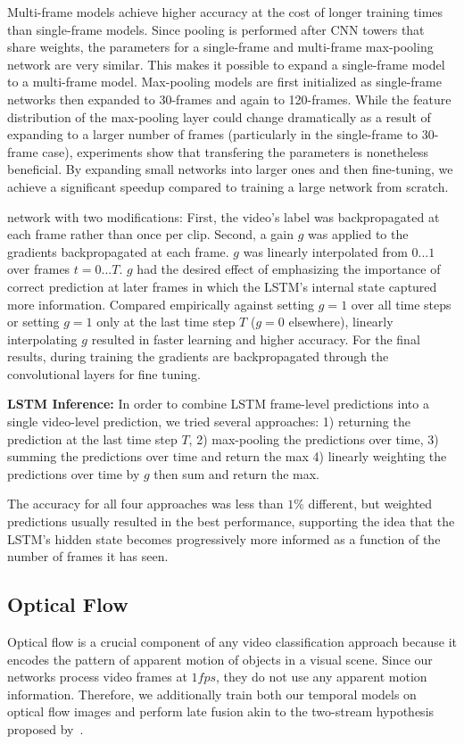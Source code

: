 \documentclass[10pt,twocolumn,letterpaper]{article}
\begin{document}
Multi-frame models achieve higher accuracy at the cost of longer
training times than single-frame models.
Since pooling is performed after CNN towers that
share weights, the parameters for a single-frame and multi-frame
max-pooling network are very similar.
This makes it possible to expand a single-frame model to a
multi-frame model. Max-pooling models are first
initialized as single-frame networks then expanded to 30-frames and
again to 120-frames. While the feature distribution of the max-pooling
layer could change dramatically as a result of expanding to a larger
number of frames (particularly in the single-frame to 30-frame case),
experiments show that transfering the parameters is nonetheless
beneficial. By expanding small networks into larger ones and then
fine-tuning, we achieve a significant speedup compared to training a
large network from scratch.

network with two modifications: First,  the
video's label was backpropagated at each frame rather than once per clip.
Second, a gain $g$ was applied to the gradients backpropagated at each frame.
$g$ was linearly interpolated from $0...1$ over frames $t=0...T$. $g$ had the
desired effect of emphasizing the importance of correct prediction at later
frames in which the LSTM's internal state captured more information. Compared
empirically against setting $g=1$ over all time steps or setting $g=1$ only at
the last time step $T$ ($g=0$ elsewhere), linearly interpolating $g$ resulted
in faster learning and higher accuracy. For the final results, during training
the gradients are backpropagated through the convolutional layers for fine
tuning.

\textbf{LSTM Inference:} In order to combine LSTM frame-level predictions into a single video-level
prediction, we tried several approaches: 1) returning the prediction at
the last time step $T$, 2) max-pooling the predictions over time,
3) summing the predictions over time and return the max 4)
linearly weighting the predictions over time by $g$ then sum and return
the max.

The accuracy for all four approaches was less than $1\%$ different,
but weighted predictions usually resulted in the best performance,
supporting the idea that the LSTM's hidden state becomes progressively
more informed as a function of the number of frames it has seen.

\vspace{-.6em}\subsection{Optical Flow}\vspace{-.6em}
Optical flow is a crucial component of any video classification approach because it encodes the pattern of
apparent motion of objects in a visual scene.
%
 Since our networks process video frames at $1fps$, they do not use any apparent motion information.
Therefore, we additionally train both our temporal models on optical flow
 images and perform late fusion akin to the two-stream hypothesis proposed by~\cite{simonyan2014two}.
\end{document}
